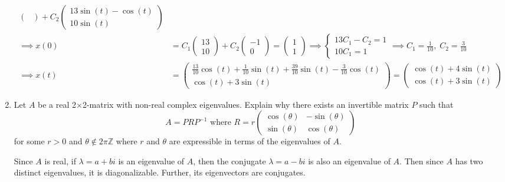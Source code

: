 \documentclass[12pt]{article}
\newcommand{\Z}{\mathbb{Z}}
\begin{document}
\begin{enumerate}
\begin{align*}
\begin{pmatrix}
            \end{pmatrix} + C_2\begin{pmatrix}
                13\sin(t) - \cos(t)\\ 10\sin(t)
            \end{pmatrix}\\ 
            \implies x(0) &= C_1 \begin{pmatrix}
                13\\ 10
            \end{pmatrix} + C_2 \begin{pmatrix}
                -1\\ 0
            \end{pmatrix} = \begin{pmatrix}
                1\\1
            \end{pmatrix} \implies \begin{cases}
                13C_1 - C_2 = 1\\
                10C_1 = 1
            \end{cases} \implies C_1 = \frac{1}{10}, \; C_2 = \frac{3}{10}\\    
            \implies x(t) &= \begin{pmatrix}
                \frac{13}{10}\cos(t) + \frac{1}{10}\sin(t) + \frac{39}{10}\sin(t) - \frac{3}{10} \cos(t)\\ 
                \cos(t) + 3\sin(t)
            \end{pmatrix} = \boxed{\begin{pmatrix}
                \cos(t) + 4\sin(t)\\ 
                \cos(t) + 3\sin(t)
            \end{pmatrix}}
       \end{align*}
    \color{black}

\pagebreak
\item Let $A$ be a real 2$\times$2-matrix with non-real complex eigenvalues.  Explain why there exists an invertible matrix $P$ such that 
\[
    A = PRP^{-1} \text{ where } R = r\left(
    \begin{array}{cc}
    \cos(\theta) & -\sin(\theta) \\
    \sin(\theta) & \cos(\theta)
    \end{array}
    \right)
\]
for some $r > 0$ and $\theta \notin 2\pi \Z$ where $r$ and $\theta$ are expressible in terms of the eigenvalues of $A$.

    \color{blue}
       Since $A$ is real, if $\lambda = a + bi$ is an eigenvalue of $A$, then the conjugate $\lambda = a - bi$ is also an eigenvalue of $A$. Then since $A$ has two distinct eigenvalues, it is diagonalizable. Further, its eigenvectors are conjugates.
        

\end{enumerate}
\end{document}

